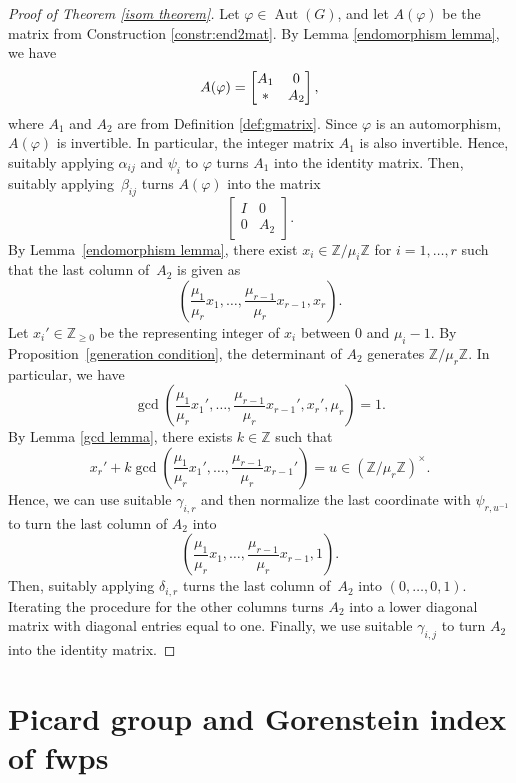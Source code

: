\documentclass{amsart}
\DeclareMathOperator{\Aut}{Aut}
\newcommand{\Z}{\mathbb{Z}}
\theoremstyle{definition}
\begin{document}
\begin{proof}[Proof of Theorem \ref{isom theorem}]
    Let $\varphi\in\Aut(G)$, and let $A(\varphi)$ be the matrix from Construction \ref{constr:end2mat}. By Lemma \ref{endomorphism lemma}, we have
    $$
    A(\varphi)=\begin{bmatrix}
        A_1 & 0 \\ \ast & A_2
    \end{bmatrix},\\[3pt]
    $$
    where $A_1$ and $A_2$ are from Definition \ref{def:gmatrix}.
    Since $\varphi$ is an automorphism, $A(\varphi)$ is invertible. In particular, the integer matrix $A_1$ is also invertible. Hence, suitably applying $\alpha_{ij}$ and $\psi_i$ to $\varphi$ turns $A_1$ into the identity matrix.
    Then, suitably applying~$\beta_{ij}$ turns $A(\varphi)$ into the matrix
    $$
    \begin{bmatrix}
        I & 0\\
        0 & A_2
    \end{bmatrix}.
    $$
    By Lemma~\ref{endomorphism lemma}, there exist $x_i\in\Z/\mu_i\Z$ for $i=1,\dots,r$ such that the last column of~$A_2$ is given as
    $$\left(\frac{\mu_1}{\mu_r}x_1,\dots,\frac{\mu_{r-1}}{\mu_r}x_{r-1},x_r\right).$$
    Let $x_i'\in\Z_{\geq 0}$ be the representing integer of $x_i$ between $0$ and $\mu_i-1$.
    By Proposition~\ref{generation condition}, the determinant of $A_2$ generates $\Z/\mu_r\Z$. In particular, we have
    $$\gcd\left(\frac{\mu_1}{\mu_r}x_1',\dots,\frac{\mu_{r-1}}{\mu_r}x_{r-1}',x_r',\mu_r\right)=1.$$ By Lemma \ref{gcd lemma}, there exists $k\in\Z$ such that
    $$x_r'+k\gcd\left(\frac{\mu_1}{\mu_r}x_1',\dots,\frac{\mu_{r-1}}{\mu_r}x_{r-1}'\right)=u\in(\Z/\mu_r\Z)^\times.
    $$
    Hence, we can use suitable $\gamma_{i,r}$ and then normalize the last coordinate with $\psi_{r,u^{-1}}$ to turn the last column of $A_2$ into
    $$
    \left(\frac{\mu_1}{\mu_r}x_1,\dots,\frac{\mu_{r-1}}{\mu_r}x_{r-1},1\right).
    $$
    Then, suitably applying $\delta_{i,r}$ turns the last column of~$A_2$ into $(0,\dots,0,1)$.
    Iterating the procedure for the other columns turns $A_2$ into a lower diagonal matrix with diagonal entries equal to one.
    Finally, we use suitable $\gamma_{i,j}$ to turn $A_2$ into the identity matrix.
\end{proof}

\section{Picard group and Gorenstein index of fwps}\label{sec:fwps}
\end{document}
